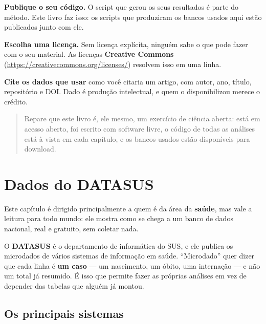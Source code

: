 \documentclass[
]{book}
\begin{document}
\textbf{Publique o seu código.} O script que gerou os seus resultados é parte do método. Este livro faz isso: os scripts que produziram os bancos usados aqui estão publicados junto com ele.

\textbf{Escolha uma licença.} Sem licença explícita, ninguém sabe o que pode fazer com o seu material. As licenças \textbf{Creative Commons} (\url{https://creativecommons.org/licenses/}) resolvem isso em uma linha.

\textbf{Cite os dados que usar} como você citaria um artigo, com autor, ano, título, repositório e DOI. Dado é produção intelectual, e quem o disponibilizou merece o crédito.

\begin{quote}
Repare que este livro é, ele mesmo, um exercício de ciência aberta: está em acesso aberto, foi escrito com software livre, o código de todas as análises está à vista em cada capítulo, e os bancos usados estão disponíveis para download.
\end{quote}

\chapter{Dados do DATASUS}\label{dados-do-datasus}

Este capítulo é dirigido principalmente a quem é da área da \textbf{saúde}, mas vale a leitura para todo mundo: ele mostra como se chega a um banco de dados nacional, real e gratuito, sem coletar nada.

O \textbf{DATASUS} é o departamento de informática do SUS, e ele publica os microdados de vários sistemas de informação em saúde. ``Microdado'' quer dizer que cada linha é \textbf{um caso} --- um nascimento, um óbito, uma internação --- e não um total já resumido. É isso que permite fazer as próprias análises em vez de depender das tabelas que alguém já montou.

\section{Os principais sistemas}\label{os-principais-sistemas}
\end{document}
